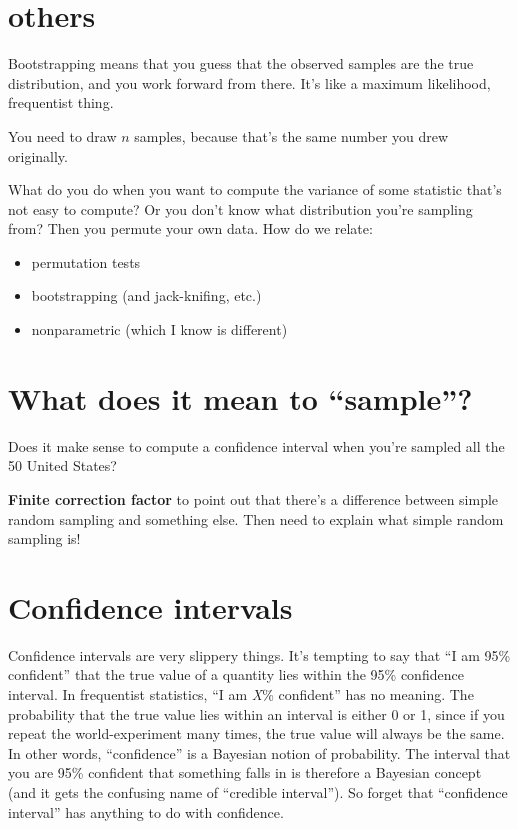 \documentclass{book}
\providecommand{\tightlist}{%
  \setlength{\itemsep}{0pt}\setlength{\parskip}{0pt}}
\begin{document}
\section{others}

Bootstrapping means that you guess that the observed samples are the true
distribution, and you work forward from there. It's like a maximum likelihood,
frequentist thing.

You need to draw $n$ samples, because that's the same number you drew originally.

What do you do when you want to compute the variance of some statistic
that's not easy to compute? Or you don't know what distribution you're
sampling from? Then you permute your own data. How do we relate:

\begin{itemize}
\tightlist
\item
  permutation tests
\item
  bootstrapping (and jack-knifing, etc.)
\item
  nonparametric (which I know is different)
\end{itemize}

\section{\texorpdfstring{What does it mean to
``sample''?}{What does it mean to sample?}}\label{what-does-it-mean-to-sample}

Does it make sense to compute a confidence interval when you're sampled
all the 50 United States?

\textbf{Finite correction factor} to point out that there's a difference
between simple random sampling and something else. Then need to explain
what simple random sampling is!

\section{Confidence intervals}\label{confidence-intervals}

Confidence intervals are very slippery things. It's tempting to say that
``I am 95\% confident'' that the true value of a quantity lies within
the 95\% confidence interval. In frequentist statistics, ``I am
\emph{X}\% confident'' has no meaning. The probability that the true
value lies within an interval is either 0 or 1, since if you repeat the
world-experiment many times, the true value will always be the same. In
other words, ``confidence'' is a Bayesian notion of probability. The
interval that you are 95\% confident that something falls in is
therefore a Bayesian concept (and it gets the confusing name of
``credible interval''). So forget that ``confidence interval'' has
anything to do with confidence.
\end{document}
